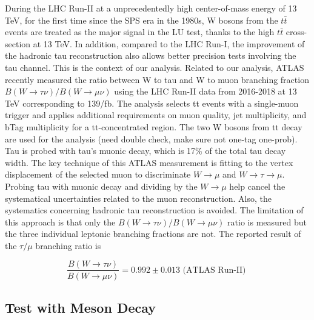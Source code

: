 During the LHC Run-II at a unprecedentedly high center-of-mass energy of 13 TeV, for the first time since the SPS era in the 1980s, W bosons from the $t\bar{t}$ events are treated as the major signal in the LU test,  thanks to the high $t\bar{t}$ cross-section at 13 TeV. In addition, compared to the LHC Run-I, the improvement of the hadronic tau reconstruction also allows better precision tests involving the tau channel. This is the context of our analysis. Related to our analysis, ATLAS recently measured the ratio between W to tau and W to muon branching fraction $B(W  \to \tau \nu) / B(W \to \mu \nu) $ using the LHC Run-II data from 2016-2018 at 13 TeV corresponding to 139/fb. The analysis selects tt events with a single-muon trigger and applies additional requirements on muon quality, jet multiplicity, and bTag multiplicity for a tt-concentrated region. The two W bosons from tt decay are used for the analysis (need double check, make sure not one-tag one-prob). Tau is probed with tau's muonic decay, which is 17\% of the total tau decay width. The key technique of this ATLAS measurement is fitting to the vertex displacement of the selected muon to discriminate $W \to \mu$ and $W \to \tau \to \mu$. Probing tau with muonic decay and dividing by the $W \to \mu$ help cancel the systematical uncertainties related to the muon reconstruction. Also, the systematics concerning hadronic tau reconstruction is avoided. The limitation of this approach is that only the $B(W  \to \tau \nu) / B(W \to \mu \nu) $ ratio is measured but the three individual leptonic branching fractions are not. The reported result of the $\tau / \mu $ branching ratio is

$$ \frac{ B(W  \to \tau \nu) }{ B(W \to \mu \nu)}  = 0.992 \pm 0.013 \text{ (ATLAS Run-II) }$$





\subsection{Test with Meson Decay}
\label{sec:relatedWorks:lu:meson}


